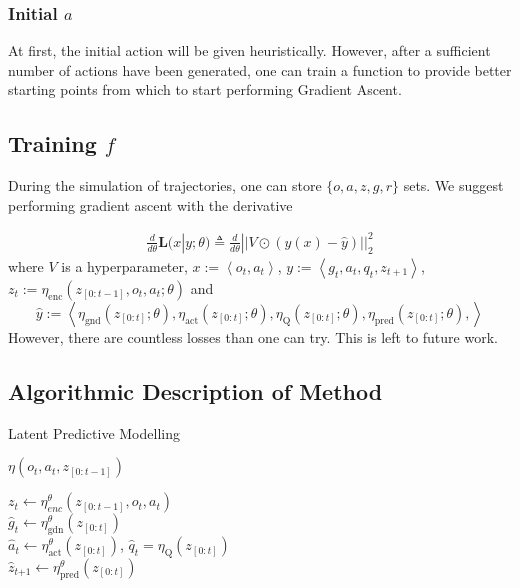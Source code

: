 \documentclass[]{article}
\begin{document}
\subsubsection{Initial $a$}

At first, the initial action will be given heuristically. However, after a sufficient number of actions have been generated, one can train a function to provide better starting points from which to start performing Gradient Ascent.


\subsection{Training $f$}

During the simulation of trajectories, one can store $\{o, a, z, g, r\}$ sets. We suggest performing gradient ascent with the derivative

\begin{align}
\frac{d}{d \theta} \boldsymbol{L}(x | y ; \theta)
\triangleq
\frac{d}{d \theta}  || V \odot (y(x) - \hat{y} )||^2_2
\end{align} 
where $V$ is a hyperparameter, $x := \left<o_t, a_t\right>$, $y := \left<g_t, a_t, q_t, z_{t+1}\right>$,  $z_t := \eta_{\text{enc}}(z_{[0:t-1]}, o_t, a_t ; \theta)$ and $$\hat{y} := \left<\eta_{\text{gnd}}(z_{[0:t]} ; \theta), \eta_{\text{act}}(z_{[0:t]} ; \theta), \eta_{\text{Q}}(z_{[0:t]} ; \theta), \eta_{\text{pred}}(z_{[0:t]};\theta), \right>$$
However, there are countless losses than one can try. This is left to future work. 
\newpage
\subsection{Algorithmic Description of Method}
\begin{algorithm}[H]
\caption{Latent Predictive Modelling}
\end{algorithm}

\begin{algorithm}[H]
\caption{$\eta(o_t, a_t, z_{[0:t-1]})$}
$z_t \leftarrow \eta^\theta_{enc}(z_{[0:t-1]}, o_t, a_t)$ \\
$\hat{g}_t \leftarrow \eta^\theta_{\text{gdn}}(z_{[0:t]})$\\
$\hat{a}_t \leftarrow \eta^\theta_{\text{act}}(z_{[0:t]})$, $\hat{q}_t = \eta_{\text{Q}}(z_{[0:t]})$\\
$\hat{z}_{t \boldsymbol{+}1} \leftarrow \eta^\theta_{\text{pred}}(z_{[0:t]})$\\
\end{algorithm}
\end{document}
